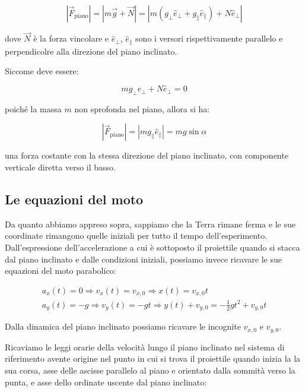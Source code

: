 \documentclass{article}
\begin{document}
\begin{equation}
|\vec{F}_\text{piano}| = |m\vec{g} + \vec{N}| = |m(g_\perp\hat{e}_\perp + g_\parallel\hat{e}_\parallel) + N\hat{e}_\perp|   
\end{equation}

dove $\vec{N}$ è la forza vincolare e $\hat{e}_\perp$, $\hat{e}_\parallel$
sono i versori rispettivamente parallelo e perpendicolre alla direzione del
piano inclinato.

Siccome deve essere:

\begin{equation}
mg_\perp\hat{e}_\perp + N\hat{e}_\perp = 0
\end{equation}

poiché la massa $m$ non sprofonda nel piano, allora si ha:

\begin{equation}
|\vec{F}_\text{piano}| =  |mg_\parallel\hat{e}_\parallel| = mg \sin\alpha
\end{equation}

una forza costante con la stessa direzione del piano inclinato,
con componente verticale diretta verso il basso.

\subsection{Le equazioni del moto}
Da quanto abbiamo appreso sopra, sappiamo che la Terra rimane ferma
e le sue coordinate rimangono quelle iniziali per tutto il tempo
dell'esperimento.
Dall'espressione dell'accelerazione a cui è sottoposto il proiettile
quando si stacca dal piano inclinato e dalle condizioni iniziali,
possiamo invece ricavare le sue equazioni del moto parabolico:

\begin{align}
a_x(t) = 0 \Rightarrow v_x(t) = v_{x,0} \Rightarrow x(t) = v_{x,0}t \\
a_y(t) = -g \Rightarrow v_y(t) = - g t \Rightarrow y(t) + v_{y,0} = - \frac{1}{2} g t^2 + v_{y,0} t  
\end{align}

Dalla dinamica del piano inclinato possiamo ricavare le incognite $v_{x,0}$ e $v_{y,0}$.

Ricaviamo le leggi orarie della velocità lungo il piano inclinato nel sistema di riferimento
avente origine nel punto in cui si trova il proiettile quando inizia la la sua corsa, asse delle
ascisse parallelo al piano e orientato dalla sommità verso la punta, e asse dello ordinate uscente
dal piano inclinato:
\end{document}

